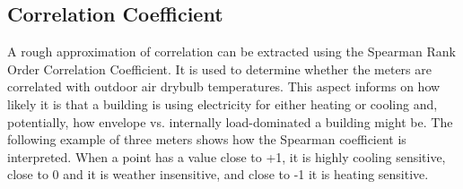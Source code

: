 \subsection{Correlation Coefficient}
\label{sec:weathercorrelationcoeff}

A rough approximation of correlation can be extracted using the Spearman Rank Order Correlation Coefficient. It is used to determine whether the meters are correlated with outdoor air drybulb temperatures. This aspect informs on how likely it is that a building is using electricity for either heating or cooling and, potentially, how envelope vs. internally load-dominated a building might be. The following example of three meters shows how the Spearman coefficient is interpreted. When a point has a value close to +1, it is highly cooling sensitive, close to 0 and it is weather insensitive, and close to -1 it is heating sensitive.